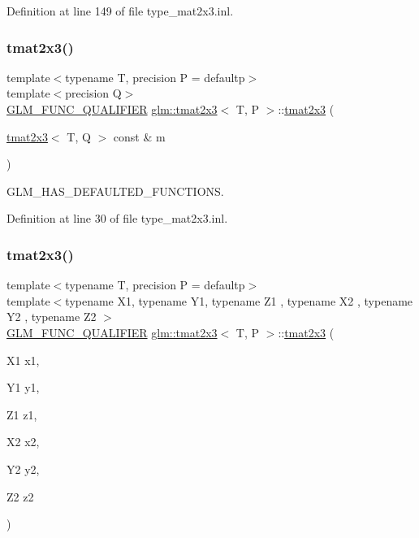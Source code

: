 Definition at line 149 of file type\+\_\+mat2x3.\+inl.

\mbox{\label{structglm_1_1tmat2x3_afb43a1d554a16750b2f42ebe95579a86}} 
\subsubsection{\texorpdfstring{tmat2x3()}{tmat2x3()}\hspace{0.1cm}{\footnotesize\ttfamily [19/22]}}
{\footnotesize\ttfamily template$<$typename T, precision P = defaultp$>$ \\
template$<$precision Q$>$ \\
\mbox{\hyperlink{setup_8hpp_a33fdea6f91c5f834105f7415e2a64407}{G\+L\+M\+\_\+\+F\+U\+N\+C\+\_\+\+Q\+U\+A\+L\+I\+F\+I\+ER}} \mbox{\hyperlink{structglm_1_1tmat2x3}{glm\+::tmat2x3}}$<$ T, P $>$\+::\mbox{\hyperlink{structglm_1_1tmat2x3}{tmat2x3}} (\begin{DoxyParamCaption}\item[{\mbox{\hyperlink{structglm_1_1tmat2x3}{tmat2x3}}$<$ T, Q $>$ const \&}]{m }\end{DoxyParamCaption})}



G\+L\+M\+\_\+\+H\+A\+S\+\_\+\+D\+E\+F\+A\+U\+L\+T\+E\+D\+\_\+\+F\+U\+N\+C\+T\+I\+O\+NS. 



Definition at line 30 of file type\+\_\+mat2x3.\+inl.

\mbox{\label{structglm_1_1tmat2x3_aafa68618483fa56dce44ee2a8bcb91c0}} 
\subsubsection{\texorpdfstring{tmat2x3()}{tmat2x3()}\hspace{0.1cm}{\footnotesize\ttfamily [20/22]}}
{\footnotesize\ttfamily template$<$typename T, precision P = defaultp$>$ \\
template$<$typename X1, typename Y1, typename Z1 , typename X2 , typename Y2 , typename Z2 $>$ \\
\mbox{\hyperlink{setup_8hpp_a33fdea6f91c5f834105f7415e2a64407}{G\+L\+M\+\_\+\+F\+U\+N\+C\+\_\+\+Q\+U\+A\+L\+I\+F\+I\+ER}} \mbox{\hyperlink{structglm_1_1tmat2x3}{glm\+::tmat2x3}}$<$ T, P $>$\+::\mbox{\hyperlink{structglm_1_1tmat2x3}{tmat2x3}} (\begin{DoxyParamCaption}\item[{X1}]{x1,  }\item[{Y1}]{y1,  }\item[{Z1}]{z1,  }\item[{X2}]{x2,  }\item[{Y2}]{y2,  }\item[{Z2}]{z2 }\end{DoxyParamCaption})}



